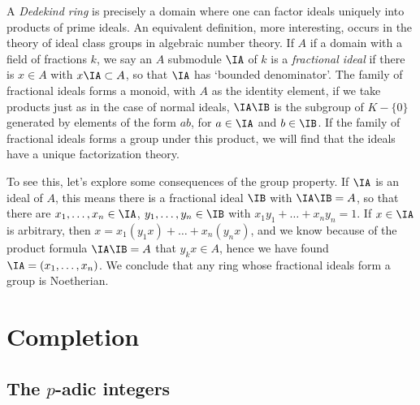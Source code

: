 A \emph{Dedekind ring} is precisely a domain where one can factor ideals uniquely into products of prime ideals. An equivalent definition, more interesting, occurs in the theory of ideal class groups in algebraic number theory. If $A$ if a domain with a field of fractions $k$, we say an $A$ submodule $\IA$ of $k$ is a \emph{fractional ideal} if there is $x \in A$ with $x \IA \subset A$, so that $\IA$ has `bounded denominator'. The family of fractional ideals forms a monoid, with $A$ as the identity element, if we take products just as in the case of normal ideals, $\IA \IB$ is the subgroup of $K - \{ 0 \}$ generated by elements of the form $ab$, for $a \in \IA$ and $b \in \IB$. If the family of fractional ideals forms a group under this product, we will find that the ideals have a unique factorization theory.

To see this, let's explore some consequences of the group property. If $\IA$ is an ideal of $A$, this means there is a fractional ideal $\IB$ with $\IA \IB = A$, so that there are $x_1, \dots, x_n \in \IA$, $y_1, \dots, y_n \in \IB$ with $x_1y_1 + \dots + x_ny_n = 1$. If $x \in \IA$ is arbitrary, then $x = x_1 (y_1 x) + \dots + x_n (y_n x)$, and we know because of the product formula $\IA \IB = A$ that $y_k x \in A$, hence we have found $\IA = (x_1, \dots, x_n)$. We conclude that any ring whose fractional ideals form a group is Noetherian.






\chapter{Completion}

\section{The $p$-adic integers}


